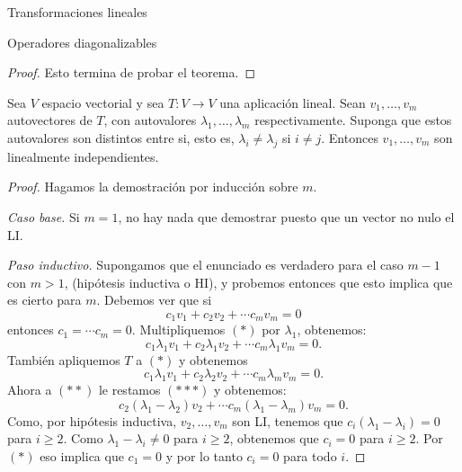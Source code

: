 \begin{chapter}{Transformaciones lineales}
\begin{section}{Operadores diagonalizables}
\begin{proof}
            Esto termina de probar el teorema.
        \end{proof}

        
        
        \begin{teorema}
            Sea $V$ espacio vectorial y sea $T: V \to V$ una aplicación lineal.  Sean $v_1,\ldots,v_m$ autovectores de $T$, con autovalores $\lambda_1,\ldots,\lambda_m$ respectivamente. Suponga que estos  autovalores son distintos entre si, esto es, $\lambda_i \ne \lambda_j$ si $i \ne j$. Entonces $v_1,\ldots,v_m$ son linealmente independientes.
        \end{teorema}
        \begin{proof}
            Hagamos la demostración por inducción sobre $m$.
            
            \textit{Caso base.} Si $m=1$, no hay nada que demostrar puesto que un vector no nulo el LI.
            
        
            
            \textit{Paso inductivo.} Supongamos que el enunciado es verdadero para el caso $m-1$ con $m>1$, (hipótesis inductiva o HI), y probemos entonces que esto implica que es cierto para $m$. Debemos ver  que si 
            \begin{equation}
            c_1v_1+	c_2v_2+ \cdots c_mv_m = 0 \tag{$*$}
            \end{equation}
            entonces $c_1 = \cdots c_m = 0$.
            Multipliquemos $(*)$ por $\lambda_1$, obtenemos:
            \begin{equation}
            c_1\lambda_1v_1+ c_2\lambda_1v_2+\cdots c_m\lambda_1v_m = 0. \tag{$**$}
            \end{equation}
            También apliquemos $T$ a $(*)$ y obtenemos
            \begin{equation}
            c_1\lambda_1v_1+ c_2\lambda_2v_2+\cdots c_m\lambda_mv_m = 0. \tag{$***$}
            \end{equation}
            Ahora a $(**)$ le restamos $(***)$ y obtenemos:
            \begin{equation}
            c_2(\lambda_1 -\lambda_2)v_2+\cdots c_m(\lambda_1 -\lambda_m)v_m = 0. 	 
            \end{equation}
            Como, por hipótesis inductiva, $v_2,\ldots,v_m$ son LI, tenemos que $c_i(\lambda_1 -\lambda_i)=0$ para $i\ge 2$. Como $\lambda_1 -\lambda_i \ne 0$ para $i\ge 2$, obtenemos que $c_i = 0$ para $i\ge 2$. Por $(*)$ eso implica que $c_1=0$ y por lo tanto $c_i=0$ para todo $i$.
        \end{proof}
        

\end{section}
\end{chapter}
